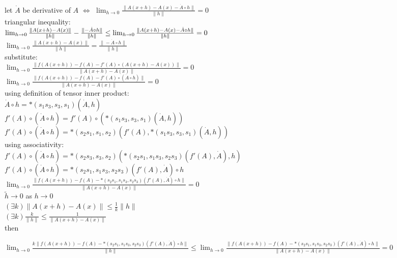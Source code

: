 \documentclass[8pt]{extarticle}
\begin{document}
\begin{multicols*}{2}
  let $\dot{A}$ be derivative of $A$ $\iff$ $\lim_{h\rightarrow 0} \frac{\| A(x+h) - A(x) - \dot{A} \circ h\|}{\| h \|} = 0$\\
  triangular inequality:\\
  $\lim_{h\rightarrow 0} \frac{\| A(x+h) - A(x) \|}{\| h \|} - \frac{\| - \dot{A} \circ h\|}{\| h \|} \\
  \leq \lim_{h\rightarrow 0} \frac{\| A(x+h) - A(x) - \dot{A} \circ h\|}{\| h \|} = 0$\\

  $\lim_{h\rightarrow 0} \frac{\| A(x+h) - A(x)\|}{\| h \|} = \frac{\| - \dot{A} \circ h \|}{\| h \|}$\\

  substitute:\\
  $\lim_{h \rightarrow 0} \frac{\| f(A(x+h)) - f(A) - f'(A) \circ (A(x+h) - A(x)) \|}{\| A(x+h) - A(x) \|} = 0$\\
  $\lim_{h \rightarrow 0} \frac{\| f(A(x+h)) - f(A) - f'(A) \circ (\dot{A} \circ h) \|}{\| A(x+h) - A(x) \|} = 0$\\

  using definition of tensor inner product:\\
  $\dot{A} \circ h = *(s_1 s_3, s_3, s_1)(\dot{A}, h)$\\
  $f'(A) \circ (\dot{A} \circ h) = f'(A) \circ (*(s_1 s_3, s_3, s_1)(\dot{A}, h))$\\
  $f'(A) \circ (\dot{A} \circ h) = *(s_2 s_1, s_1, s_2)(f'(A), *(s_1 s_3, s_3, s_1)(\dot{A}, h))$\\

  using associativity:\\
  $f'(A) \circ (\dot{A} \circ h) = *(s_2 s_3, s_3, s_2)(*(s_2 s_1, s_1 s_3, s_2 s_3)(f'(A), \dot{A}), h)$\\
  $f'(A) \circ (\dot{A} \circ h) = *(s_2 s_1, s_1 s_3, s_2 s_3)(f'(A), \dot{A}) \circ h$\\

  $\lim_{h \rightarrow 0} \frac{\| f(A(x+h)) - f(A) - *(s_2 s_1, s_1 s_3, s_2 s_3)(f'(A), \dot{A}) \circ h \|}{\| A(x+h) - A(x) \|} = 0$\\

  $\tilde{h} \rightarrow 0$ as $h \rightarrow 0$\\
  $(\exists k) \| A(x+h) - A(x) \| \leq \frac{1}{k} \| h \|$\\
  $(\exists k) \frac{k}{\|h\|} \leq \frac{1}{\| A(x+h) - A(x) \|}$\\
  then

  $\lim_{h \rightarrow 0} \frac{ k \| f(A(x+h)) - f(A) - *(s_2 s_1, s_1 s_3, s_2 s_3)(f'(A), \dot{A}) \circ h \|}{\|h\|} \leq \lim_{h\rightarrow 0} \frac{\| f(A(x+h)) - f(A) - *(s_2 s_1, s_1 s_3, s_2 s_3)(f'(A), \dot{A}) \circ h \|}{\|A(x+h) - A(x)\|} = 0$\\


\end{multicols*}
\end{document}

